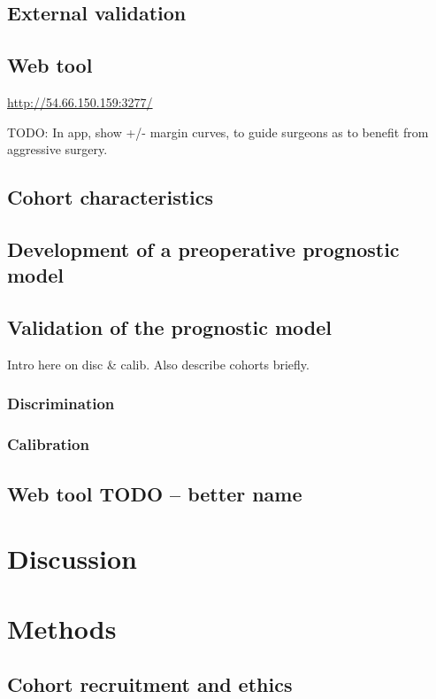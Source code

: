 \documentclass[dissertation.tex]{subfiles}
\begin{document}
\subsection{External validation}



\subsection{Web tool}
\hyperref[http://54.66.150.159:3277/]{http://54.66.150.159:3277/}


%

TODO: In app, show +/- margin curves, to guide surgeons as to benefit from aggressive surgery.


\subsection{Cohort characteristics}
\label{subsec:nomo-results-cohort}

\subsection{Development of a preoperative prognostic model}

\subsection{Validation of the prognostic model}
Intro here on disc \& calib.  Also describe cohorts briefly.
\subsubsection{Discrimination}
\subsubsection{Calibration}

\subsection{Web tool TODO -- better name}

\section{Discussion}

\section{Methods}
\subsection{Cohort recruitment and ethics}
\label{subsec:nomo-methods-cohort}
\end{document}
